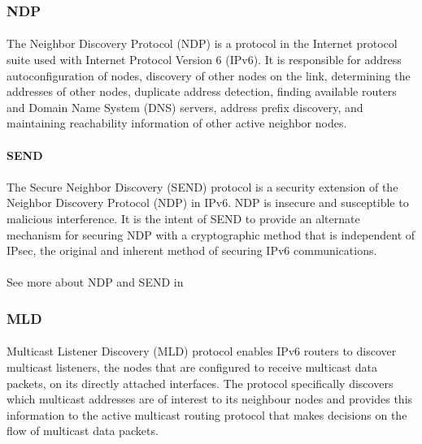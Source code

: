\subsubsection{NDP}
\paragraph{}
The Neighbor Discovery Protocol (NDP) is a protocol in the Internet protocol suite used with Internet Protocol Version 6 (IPv6). It is responsible for address autoconfiguration of nodes, discovery of other nodes on the link, determining the addresses of other nodes, duplicate address detection, finding available routers and Domain Name System (DNS) servers, address prefix discovery, and maintaining reachability information of other active neighbor nodes.

\paragraph{} \textbf{SEND}
\paragraph{}
The Secure Neighbor Discovery (SEND) protocol is a security extension of the Neighbor Discovery Protocol (NDP) in IPv6. NDP is insecure and susceptible to malicious interference. It is the intent of SEND to provide an alternate mechanism for securing NDP with a cryptographic method that is independent of IPsec, the original and inherent method of securing IPv6 communications.
\paragraph{}
See more about NDP and SEND in \cite{NDP_SEND}

\subsubsection{MLD}
\paragraph{}
Multicast Listener Discovery (MLD) protocol enables IPv6 routers to discover multicast listeners, the nodes that are configured to receive multicast data packets, on its directly attached interfaces. The protocol specifically discovers which multicast addresses are of interest to its neighbour nodes and provides this information to the active multicast routing protocol that makes decisions on the flow of multicast data packets. 
